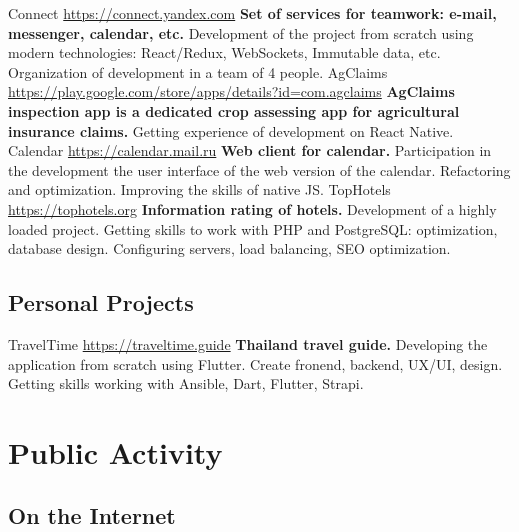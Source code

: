 \documentclass[11pt,a4paper]{moderncv}
\begin{document}
  \cvline
    {Connect}
    {\url{https://connect.yandex.com}\newline{}
    \textbf{Set of services for teamwork: e-mail, messenger, calendar, etc.}\newline{}
    Development of the project from scratch using modern technologies:
    React/Redux, WebSockets, Immutable data, etc.
    Organization of development in a team of 4 people.}
  \cvline
    {AgClaims}
    {\url{https://play.google.com/store/apps/details?id=com.agclaims}\newline{}
    \textbf{AgClaims inspection app is a dedicated crop assessing app for agricultural insurance claims.}\newline{}
    Getting experience of development on React Native.}
  \cvline
    {Calendar}
    {\url{https://calendar.mail.ru}\newline{}
    \textbf{Web client for calendar.}\newline{}
    Participation in the development the user interface of the web version of the calendar.\newline{}
    Refactoring and optimization. Improving the skills of native JS.}
  \cvline
    {TopHotels}
    {\url{https://tophotels.org}\newline{}
    \textbf{Information rating of hotels.}\newline{}
    Development of a highly loaded project.
    Getting skills to work with PHP and PostgreSQL: optimization, database design.
    Configuring servers, load balancing, SEO optimization.}

  \subsection{Personal Projects}
  \cvline
    {TravelTime}
    {\url{https://traveltime.guide}\newline{}
    \textbf{Thailand travel guide.}\newline{}
    Developing the application from scratch using Flutter. Create fronend, backend, UX/UI, design. 
    Getting skills working with Ansible, Dart, Flutter, Strapi.}

\section{Public Activity}
  \subsection{On the Internet}
\end{document}
